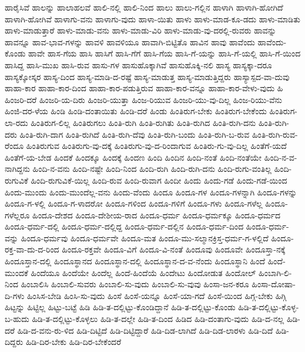 ಹಾರೈಸಿವೆ
ಹಾಲನ್ನು
ಹಾಲಾಹಲವೆ
ಹಾಲಿ-ನಲ್ಲಿ
ಹಾಲಿ-ನಿಂದ
ಹಾಲು
ಹಾಲು-ಗಲ್ಲಿನ
ಹಾಳಾಗಿ
ಹಾಳಾಗಿ-ಹೋಗಿದೆ
ಹಾಳಾಗಿ-ಹೋಗಿವೆ
ಹಾಳಾಗು-ವನು
ಹಾಳಾಗು-ವುದು
ಹಾಳಾ-ಯಿತು
ಹಾಳು
ಹಾಳು-ಮಾಡ-ಕೂ-ಡದು
ಹಾಳು-ಮಾಡಿತು
ಹಾಳು-ಮಾಡುತ್ತಾರೆ
ಹಾಳು-ಮಾಡು-ವನು
ಹಾಳು-ಮಾಡು-ವಿರಿ
ಹಾಳು-ಮಾಡು-ವು-ದರಲ್ಲಿ-ರುವರು
ಹಾವನ್ನು
ಹಾವನ್ನೂ
ಹಾವ-ಭಾವ-ಗಳನ್ನು
ಹಾವಳಿ
ಹಾವಳಿಯೂ
ಹಾವಾಗಿ-ಬಿಟ್ಟಿತೊ
ಹಾವಿನ
ಹಾವು
ಹಾವೆಂದು
ಹಾವೆಂದು-ಕೊಂಡು
ಹಾವೇ
ಹಾಸ-ಗೆಯ
ಹಾಸಿ
ಹಾಸಿಗೆ
ಹಾಸಿ-ಗೆಗೆ
ಹಾಸಿ-ಗೆಯ
ಹಾಸಿ-ಗೆ-ಯನ್ನು
ಹಾಸಿ-ಗೆ-ಯಲ್ಲಿ
ಹಾಸಿ-ಗೆ-ಯಿಂದ
ಹಾಸಿದ್ದ
ಹಾಸಿ-ಮುಖ
ಹಾಸಿ-ರುವ
ಹಾಸು-ಗಳ
ಹಾಸುಹೊಕ್ಕಾಗಿವೆ
ಹಾಸುಹೊಕ್ಕಿ-ನಲಿ
ಹಾಸ್ಯ
ಹಾಸ್ಯಕ್ಕಾ-ದರೂ
ಹಾಸ್ಯಕ್ಕೋಸ್ಕರ
ಹಾಸ್ಯ-ದಿಂದ
ಹಾಸ್ಯ-ಮಾಡಿ-ದ-ರಷ್ಟೆ
ಹಾಸ್ಯ-ಮಾಡುತ್ತ
ಹಾಸ್ಯ-ಮಾಡುತ್ತಿದ್ದರು
ಹಾಸ್ಯಾಸ್ಪದ-ವಾ-ದುವು
ಹಾಹಾ-ಕಾರ
ಹಾಹಾ-ಕಾರ-ದಿಂದ
ಹಾಹಾ-ಕಾರ-ಪಡುತ್ತಿರುವ
ಹಾಹಾ-ಕಾರ-ವನ್ನೂ
ಹಾಹಾ-ಕಾರ-ವೇಳು-ವುದು
ಹಿ
ಹಿಂಜರಿ-ದರೆ
ಹಿಂಜರಿ-ಯ-ದಿರು
ಹಿಂಜರಿ-ಯುತ್ತಾ
ಹಿಂಜ-ರಿಯುವ
ಹಿಂಜರಿ-ಯು-ವು-ದಿಲ್ಲ
ಹಿಂಜ-ರಿಯು-ವೆನು
ಹಿಂಜಿ-ದರ-ಳೆಯ
ಹಿಂಡಿ
ಹಿಂಡಿ-ದಂತಾಯಿತು
ಹಿಂಡಿ-ದರೆ
ಹಿಂಡು
ಹಿಂತಿರುಗ-ಬೇಕು
ಹಿಂತಿರುಗ-ಬೇಕೆಂದು
ಹಿಂತಿರುಗ-ಲಾ-ರದು
ಹಿಂತಿರುಗ-ಲಿಲ್ಲ
ಹಿಂತಿರುಗಲು
ಹಿಂತಿ-ರುಗಿ
ಹಿಂತಿ-ರುಗಿತು
ಹಿಂತಿ-ರುಗಿದ
ಹಿಂತಿ-ರುಗಿ-ದನು
ಹಿಂತಿ-ರುಗಿ-ದರು
ಹಿಂತಿ-ರುಗಿ-ದಾಗ
ಹಿಂತಿ-ರುಗಿದೆ
ಹಿಂತಿ-ರುಗಿ-ದೆವು
ಹಿಂತಿ-ರುಗಿ-ಬಂದು
ಹಿಂತಿ-ರುಗಿ-ಬ-ರುವ
ಹಿಂತಿ-ರುಗಿ-ರುವ-ರೆಂದೂ
ಹಿಂತಿರುಗುವ
ಹಿಂತಿರುಗು-ವು-ದಕ್ಕೆ
ಹಿಂತಿರುಗು-ವು-ದ-ರಿಂದಾಗುವ
ಹಿಂತಿರು-ಗು-ವು-ದಿಲ್ಲ
ಹಿಂತೆಗೆ-ಯದೆ
ಹಿಂತೆಗೆ-ಯ-ಬೇಡ
ಹಿಂದಕೆ
ಹಿಂದಕ್ಕೂ
ಹಿಂದಕ್ಕೆ
ಹಿಂದಣ
ಹಿಂದಿ
ಹಿಂದಿನ
ಹಿಂದಿ-ನಂತೆ
ಹಿಂದಿ-ನಂತೆಯೇ
ಹಿಂದಿ-ನ-ವ-ನಾಗಿದ್ದನು
ಹಿಂದಿ-ನ-ವನು
ಹಿಂದಿ-ನಷ್ಟೇ
ಹಿಂದಿ-ನಿಂದ
ಹಿಂದಿ-ರುಗಿ
ಹಿಂದಿ-ರುಗಿ-ದನು
ಹಿಂದಿ-ರುಗು-ವಂತಿಲ್ಲ
ಹಿಂದಿ-ರುಗುವಿಕೆ
ಹಿಂದಿ-ರುಗುವಿಕೆ-ಯಿಲ್ಲ
ಹಿಂದಿ-ರುವ
ಹಿಂದಿ-ರುವಾಗ
ಹಿಂದೀ
ಹಿಂದು
ಹಿಂದು-ಗಡೆ
ಹಿಂದು-ಗಡೆ-ಯಿಂದ
ಹಿಂದು-ಮುಂದು
ಹಿಂದು-ಮುಂದೆಲ್ಲ-ವನು
ಹಿಂದು-ವೆಂದು
ಹಿಂದೂ
ಹಿಂದೂ-ಗಳ
ಹಿಂದೂ-ಗಳನ್ನಾಗಿ
ಹಿಂದೂ-ಗಳನ್ನು
ಹಿಂದೂ-ಗ-ಳಲ್ಲಿ
ಹಿಂದೂ-ಗ-ಳಾದರೋ
ಹಿಂದೂ-ಗಳಿಂದ
ಹಿಂದೂ-ಗಳಿಗೆ
ಹಿಂದೂ-ಗಳು
ಹಿಂದೂ-ಗಳೆಲ್ಲ
ಹಿಂದೂ-ಗಳೆಲ್ಲರೂ
ಹಿಂದೂ-ದೇಶದ
ಹಿಂದೂ-ದೇಶೀಯ-ರಾದ
ಹಿಂದೂ-ಧರ್ಮ
ಹಿಂದೂ-ಧರ್ಮಕ್ಕೂ
ಹಿಂದೂ-ಧರ್ಮದ
ಹಿಂದೂ-ಧರ್ಮ-ದಲ್ಲಿ
ಹಿಂದೂ-ಧರ್ಮ-ದಲ್ಲಿದ್ದ
ಹಿಂದೂ-ಧರ್ಮ-ದಲ್ಲಿನ
ಹಿಂದೂ-ಧರ್ಮ-ದಿಂದ
ಹಿಂದೂ-ಧರ್ಮ-ವನ್ನು
ಹಿಂದೂ-ಧರ್ಮವು
ಹಿಂದೂ-ಧರ್ಮವೇ
ಹಿಂದೂ-ಮತ
ಹಿಂದೂ-ಮು-ಸಲ್ಮಾನಕ್ರಿಸ್ತ-ಧರ್ಮ-ಗ-ಳಲ್ಲಿದೆ
ಹಿಂದೂ-ರಕ್ತ-ವಾ-ದು-ದ-ರಿಂದ
ಹಿಂದೂ-ರಕ್ತವೇ
ಹಿಂದೂ-ವಿಗೆ
ಹಿಂದೂ-ವಿ-ನಂತೆ
ಹಿಂದೂವು
ಹಿಂದೂವೇ
ಹಿಂದೂಸ್ತಾ-ನಕ್ಕೆ
ಹಿಂದೂಸ್ತಾನ-ದಲ್ಲಿ
ಹಿಂದೂಸ್ಥಾನದ
ಹಿಂದೂಸ್ಥಾನ-ದಲ್ಲಿ
ಹಿಂದೂಸ್ಥಾನ-ದ-ವ-ನೆಂದು
ಹಿಂದೂಸ್ಥಾನಿ
ಹಿಂದೆ
ಹಿಂದೆ-ಮುಂದಕೆ
ಹಿಂದೆಯೂ
ಹಿಂದೆಯೇ
ಹಿಂದೆಲ್ಲ
ಹಿಂದೆ-ಹಿಂದೆಯೆ
ಹಿಂದೇಟು
ಹಿಂದೋಡುತ
ಹಿಂದೋಲ್
ಹಿಂಬಾಗಿ-ಲಿ-ನಿಂದ
ಹಿಂಬಾಲಿಸಿ
ಹಿಂಬಾಲಿ-ಸುವರು
ಹಿಂಬಾಲಿ-ಸು-ವುದು
ಹಿಂಬಾಲಿ-ಸು-ವುವು
ಹಿಂಸಾ-ಜನ-ಕರೂ
ಹಿಂಸಾ-ದೋಷಾ-ದಿ-ಗಳು
ಹಿಂಸಿಸ-ಬೇಡಿ
ಹಿಂಸಿ-ಸು-ವುದು
ಹಿಂಸೆ
ಹಿಂಸೆ-ಯನ್ನೂ
ಹಿಂಸೆ-ಯಾ-ಗದೆ
ಹಿಂಸೆ-ಯಿಂದ
ಹಿಗ್ಗ-ಬೇಕು
ಹಿಗ್ಗಿ
ಹಿಟ್ಟನ್ನು
ಹಿಟ್ಟಿಲ್ಲ
ಹಿಟ್ಟು-ಬಟ್ಟೆ
ಹಿಡಿ
ಹಿಡಿ-ತ-ದಲ್ಲಿಟ್ಟು-ಕೊಂಡಿದ್ದಾನೆ
ಹಿಡಿ-ತ-ದಲ್ಲಿಟ್ಟು-ಕೊಂಡು
ಹಿಡಿ-ತ-ದಲ್ಲಿಟ್ಟು-ಕೊಳ್ಳ-ಬ-ಹುದು
ಹಿಡಿ-ತ-ದಲ್ಲಿಟ್ಟು-ಕೊಳ್ಳಲು
ಹಿಡಿ-ತ-ದಲ್ಲೇ
ಹಿಡಿ-ತ-ದಿಂದ
ಹಿಡಿದ
ಹಿಡಿ-ದಂತಾಗು-ವುದು
ಹಿಡಿ-ದ-ನಲ್ಲ
ಹಿಡಿ-ದರೆ
ಹಿಡಿ-ದ-ವನು-ರು-ಳಿದ
ಹಿಡಿ-ದಿಟ್ಟಿದೆ
ಹಿಡಿ-ದಿಟ್ಟಿದ್ದಾರೆ
ಹಿಡಿ-ದಿಡ-ಲಾಗಿದೆ
ಹಿಡಿ-ದಿಡ-ಲಾರಳು
ಹಿಡಿ-ದಿದೆ
ಹಿಡಿ-ದಿದ್ದರು
ಹಿಡಿ-ದಿರ-ಬೇಕು
ಹಿಡಿ-ದಿರ-ಬೇಕೆಂದರೆ
